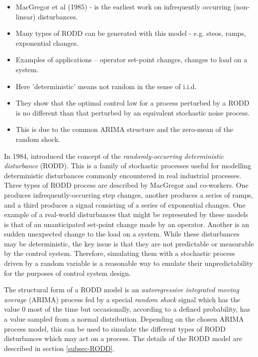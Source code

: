 \begin{itemize}
	\item MacGregor et al (1985) - is the earliest work on infrequently occurring (non-linear) disturbances.
	\item Many types of RODD can be generated with this model - e.g. steos, ramps, exponential changes.
	\item Examples of applications – operator set-point changes, changes to load on a system.
	\item Here 'deterministic' means not random in the sense of i.i.d.
	\item They show that the optimal control law for a process perturbed by a RODD is no different than that perturbed by an equivalent stochastic noise process.
	\item This is due to the common ARIMA structure and the zero-mean of the random shock. 
\end{itemize}


In 1984, \cite{macgregor_duality_1984} introduced the concept of the \textit{randomly-occurring deterministic disturbance} (RODD). This is a family of stochastic processes useful for modelling deterministic disturbances commonly encountered in real industrial processes. Three types of RODD process are described by MacGregor and co-workers. One produces infrequently-occurring step changes, another produces a series of ramps, and a third produces a signal consisting of a series of exponential changes. One example of a real-world disturbances that might be represented by these models is that of an unanticipated set-point change made by an operator. Another is an sudden unexpected change to the load on a system. While these disturbances may be deterministic, the key issue is that they are not predictable or measurable by the control system. Therefore, simulating them with a stochastic process driven by a random variable is a reasonable way to emulate their unpredictability for the purposes of control system design.

The structural form of a RODD model is an \textit{autoregressive integrated moving average} (ARIMA) process fed by a special \textit{random shock} signal which has the value 0 most of the time but occasionally, according to a defined probability, has a value sampled from a normal distribution. Depending on the chosen ARIMA process model, this can be used to simulate the different types of RODD disturbances which may act on a process. The details of the RODD model are described in section \ref{subsec-RODD}.

